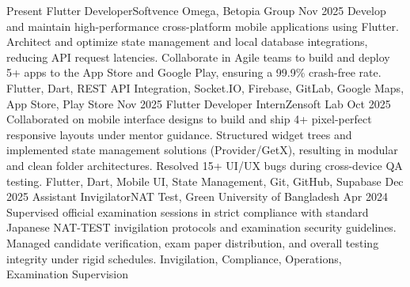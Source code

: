 \documentclass[localFont,alternative,monochrome]{documentMETADATA}
\begin{document}
	\begin{experiences}
	  \experience
	    {Present}       {Flutter Developer}{Softvence Omega, Betopia Group}{}
	    {Nov 2025}      {
	                      Develop and maintain high-performance cross-platform mobile applications using Flutter. Architect and optimize state management and local database integrations, reducing API request latencies. Collaborate in Agile teams to build and deploy 5+ apps to the App Store and Google Play, ensuring a 99.9\% crash-free rate.
	                    }
	                    {Flutter, Dart, REST API Integration, Socket.IO, Firebase, GitLab, Google Maps, App Store, Play Store}
	  \emptySeparator
	  \experience
	    {Nov 2025}      {Flutter Developer Intern}{Zensoft Lab}{}
	    {Oct 2025}      {
	                      Collaborated on mobile interface designs to build and ship 4+ pixel-perfect responsive layouts under mentor guidance. Structured widget trees and implemented state management solutions (Provider/GetX), resulting in modular and clean folder architectures. Resolved 15+ UI/UX bugs during cross-device QA testing.
	                    }
	                    {Flutter, Dart, Mobile UI, State Management, Git, GitHub, Supabase}
	  \emptySeparator
	  \experience
	    {Dec 2025}      {Assistant Invigilator}{NAT Test, Green University of Bangladesh}{}
	    {Apr 2024}      {
	                      Supervised official examination sessions in strict compliance with standard Japanese NAT-TEST invigilation protocols and examination security guidelines. Managed candidate verification, exam paper distribution, and overall testing integrity under rigid schedules.
	                    }
	                    {Invigilation, Compliance, Operations, Examination Supervision}
	\end{experiences}
\end{document}
